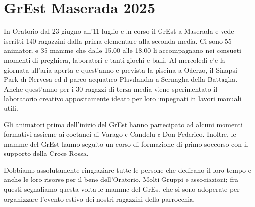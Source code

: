 \section{GrEst Maserada 2025}

In Oratorio dal 23 giugno all'11 luglio e in corso il GrEst a Maserada e vede
iscritti 140 ragazzini dalla prima elementare alla seconda media. Ci sono 55
animatori e 35 mamme che dalle 15.00 alle 18.00 li accompagnano nei consueti
momenti di preghiera, laboratori e tanti giochi e balli. Al mercoledi c'e la
giornata all'aria aperta e quest'anno e prevista la piscina a Oderzo, il
Sinapsi Park di Nervesa ed il parco acquatico Plavilandia a Sernaglia della
Battaglia. Anche quest'anno per i 30 ragazzi di terza media viene sperimentato
il laboratorio creativo appositamente ideato per loro impegnati in lavori
manuali utili.

Gli animatori prima dell'inizio del GrEst hanno partecipato ad
alcuni momenti formativi assieme ai coetanei di Varago e Candelu e Don
Federico. Inoltre, le mamme del GrEst hanno seguito un corso di formazione di
primo soccorso con il supporto della Croce Rossa.

Dobbiamo assolutamente ringraziare tutte le persone che dedicano il loro tempo
e anche le loro risorse per il bene dell'Oratorio. Molti Gruppi e
associazioni; fra questi segnaliamo questa volta le mamme del GrEst che si
sono adoperate per organizzare l'evento estivo dei nostri ragazzini della
parrocchia.


